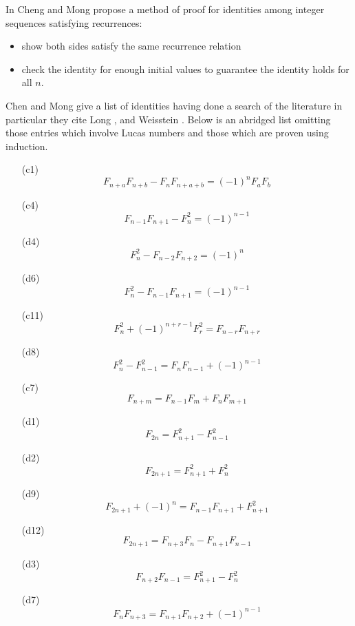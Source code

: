 \documentclass[12pt,a4paper]{amsart}
\begin{document}
In \cite{cheng} Cheng and Mong propose a method of proof for
identities among integer sequences satisfying recurrences:
\begin{itemize}
	\item show both sides satisfy the same recurrence relation
	\item check the identity for enough initial values to
		guarantee the identity holds for all $n$.
\end{itemize}
Chen and Mong give a list of identities having done a  search of the
literature in particular they cite Long \cite{long}, and  Weisstein
\cite{weis}. Below is an abridged list omitting those entries which
involve Lucas numbers and those which are proven using induction.

\begin{itemize}

\item[(c1)] $$F_{n+a}F_{n+b} - F_n F_{n+a+b} = (-1)^n F_a F_b$$
\item[(c4)] $$F_{n-1}F_{n+1} - F_n^2 = (-1)^{n-1}$$
\item[(d4)] $$F_n^2 - F_{n-2}F_{n+2} = (-1)^n$$
\item[(d6)] $$F_n^2 - F_{n-1}F_{n+1} = (-1)^{n-1}$$
\item[(c11)] $$F_n^2 + (-1)^{n+r-1}F_r^2 = F_{n-r}F_{n+r}$$
\item[(d8)] $$F_n^2 - F_{n-1}^2 = F_n F_{n-1} + (-1)^{n-1}$$
\item[(c7)] $$F_{n+m} = F_{n-1}F_m + F_n F_{m+1}$$
\item[(d1)] $$F_{2n} = F_{n+1}^2 - F_{n-1}^2$$
\item[(d2)] $$F_{2n+1} = F_{n+1}^2 + F_n^2$$
\item[(d9)] $$F_{2n+1} + (-1)^n = F_{n-1}F_{n+1} + F_{n+1}^2$$
\item[(d12)] $$F_{2n+1} = F_{n+3}F_n - F_{n+1}F_{n-1}$$

\item[(d3)] $$F_{n+2}F_{n-1} = F_{n+1}^2 - F_n^2$$




\item[(d7)] $$F_n F_{n+3} = F_{n+1}F_{n+2} + (-1)^{n-1}$$


\end{itemize}
\end{document}
